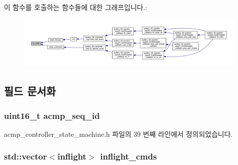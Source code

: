 이 함수를 호출하는 함수들에 대한 그래프입니다.\+:
\nopagebreak
\begin{figure}[H]
\begin{center}
\leavevmode
\includegraphics[width=350pt]{classavdecc__lib_1_1acmp__controller__state__machine_a1a1c2c9ae3773c01cbad352f2a2c2dfc_icgraph}
\end{center}
\end{figure}




\subsection{필드 문서화}
\subsubsection[{\texorpdfstring{acmp\+\_\+seq\+\_\+id}{acmp_seq_id}}]{\setlength{\rightskip}{0pt plus 5cm}uint16\+\_\+t acmp\+\_\+seq\+\_\+id\hspace{0.3cm}{\ttfamily [private]}}\hypertarget{classavdecc__lib_1_1acmp__controller__state__machine_abc8353807adf298f195ae2f0dc170b51}{}\label{classavdecc__lib_1_1acmp__controller__state__machine_abc8353807adf298f195ae2f0dc170b51}


acmp\+\_\+controller\+\_\+state\+\_\+machine.\+h 파일의 39 번째 라인에서 정의되었습니다.

\subsubsection[{\texorpdfstring{inflight\+\_\+cmds}{inflight_cmds}}]{\setlength{\rightskip}{0pt plus 5cm}std\+::vector$<${\bf inflight}$>$ inflight\+\_\+cmds\hspace{0.3cm}{\ttfamily [private]}}\hypertarget{classavdecc__lib_1_1acmp__controller__state__machine_a0475b054c1890c88809394d9cef2a4c0}{}\label{classavdecc__lib_1_1acmp__controller__state__machine_a0475b054c1890c88809394d9cef2a4c0}


